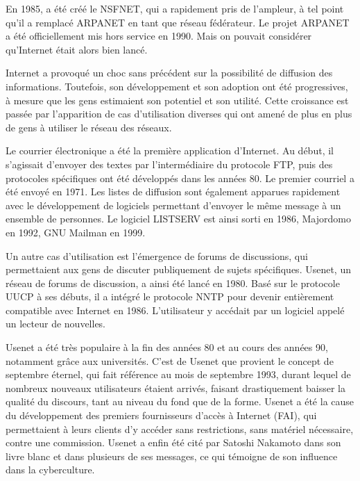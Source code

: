 En 1985, a été créé le NSFNET, qui a rapidement pris de l'ampleur, à tel point qu'il a remplacé ARPANET en tant que réseau fédérateur. Le projet ARPANET a été officiellement mis hors service en 1990. Mais on pouvait considérer qu'Internet était alors bien lancé.


Internet a provoqué un choc sans précédent sur la possibilité de diffusion des informations. Toutefois, son développement et son adoption ont été progressives, à mesure que les gens estimaient son potentiel et son utilité. Cette croissance est passée par l'apparition de cas d'utilisation diverses qui ont amené de plus en plus de gens à utiliser le réseau des réseaux.

Le courrier électronique a été la première application d'Internet. Au début, il s'agissait d'envoyer des textes par l'intermédiaire du protocole FTP, puis des protocoles spécifiques ont été développés dans les années 80. Le premier courriel a été envoyé en 1971. Les listes de diffusion sont également apparues rapidement avec le développement de logiciels permettant d'envoyer le même message à un ensemble de personnes. Le logiciel LISTSERV est ainsi sorti en 1986, Majordomo en 1992, GNU Mailman en 1999.

Un autre cas d'utilisation est l'émergence de forums de discussions, qui permettaient aux gens de discuter publiquement de sujets spécifiques. Usenet, un réseau de forums de discussion, a ainsi été lancé en 1980. Basé sur le protocole UUCP à ses débuts, il a intégré le protocole NNTP pour devenir entièrement compatible avec Internet en 1986. L'utilisateur y accédait par un logiciel appelé un lecteur de nouvelles.

Usenet a été très populaire à la fin des années 80 et au cours des années 90, notamment grâce aux universités. C'est de Usenet que provient le concept de septembre éternel, qui fait référence au mois de septembre 1993, durant lequel de nombreux nouveaux utilisateurs étaient arrivés, faisant drastiquement baisser la qualité du discours, tant au niveau du fond que de la forme. Usenet a été la cause du développement des premiers fournisseurs d'accès à Internet (FAI), qui permettaient à leurs clients d'y accéder sans restrictions, sans matériel nécessaire, contre une commission. Usenet a enfin été cité par Satoshi Nakamoto dans son livre blanc et dans plusieurs de ses messages, ce qui témoigne de son influence dans la cyberculture. %

